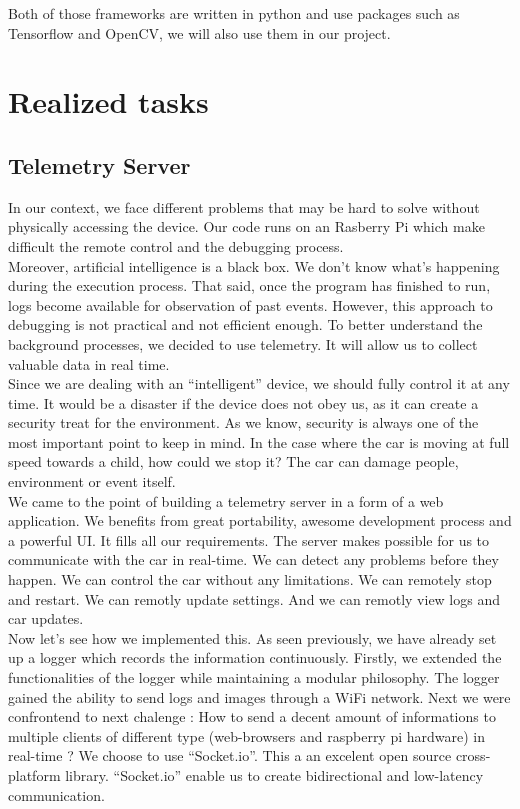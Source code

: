 \documentclass[12pt]{article}
\begin{document}
Both of those frameworks are written in python and use packages such as Tensorflow and OpenCV, we will also use them in our project.
\newpage



\section{Realized tasks}

\subsection{Telemetry Server}

In our context, we face different problems that may be hard to solve without physically accessing the device. Our code runs on an Rasberry Pi which make difficult the remote control and the debugging process. \\

Moreover, artificial intelligence is a black box. We don't know what's happening during the execution process. That said, once the program has finished to run, logs become available for observation of past events. However, this approach to debugging is not practical and not efficient enough. To better understand the background processes, we decided to use telemetry. It will allow us to collect valuable data in real time. \\

Since we are dealing with an “intelligent” device, we should fully control it at any time. It would be a disaster if the device does not obey us, as it can create a security treat for the environment. As we know, security is always one of the most important point to keep in mind. In the case where the car is moving at full speed towards a child, how could we stop it? The car can damage people, environment or event itself. \\

We came to the point of building a telemetry server in a form of a web application. We benefits from great portability, awesome development process and a powerful UI. It fills all our requirements. The server makes possible for us to communicate with the car in real-time. We can detect any problems before they happen. We can control the car without any limitations. We can remotely stop and restart. We can remotly update settings. And we can remotly view logs and car updates. \\

Now let's see how we implemented this. As seen previously, we have already set up a logger which records the information continuously. Firstly, we extended the functionalities of the logger while maintaining a modular philosophy. The logger gained the ability to send logs and images through a WiFi network. Next we were confrontend to next chalenge : How to send a decent amount of informations to multiple clients of different type (web-browsers and raspberry pi hardware) in real-time ? We choose to use “Socket.io”. This a an excelent open source cross-platform library. “Socket.io” enable us to create bidirectional and low-latency communication. \\
\end{document}
